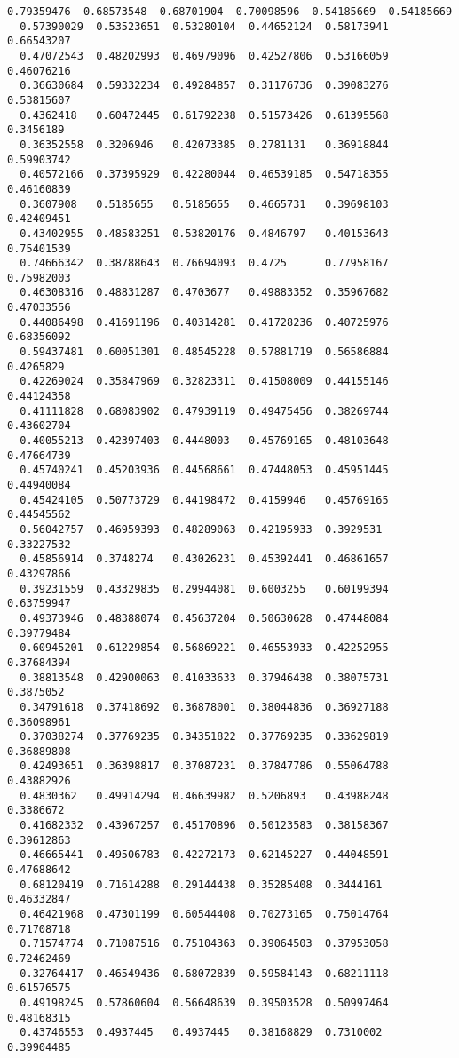 \documentclass[11pt]{article}
\begin{document}
\begin{Verbatim}[commandchars=\\\{\}]
  0.79359476  0.68573548  0.68701904  0.70098596  0.54185669  0.54185669
  0.57390029  0.53523651  0.53280104  0.44652124  0.58173941  0.66543207
  0.47072543  0.48202993  0.46979096  0.42527806  0.53166059  0.46076216
  0.36630684  0.59332234  0.49284857  0.31176736  0.39083276  0.53815607
  0.4362418   0.60472445  0.61792238  0.51573426  0.61395568  0.3456189
  0.36352558  0.3206946   0.42073385  0.2781131   0.36918844  0.59903742
  0.40572166  0.37395929  0.42280044  0.46539185  0.54718355  0.46160839
  0.3607908   0.5185655   0.5185655   0.4665731   0.39698103  0.42409451
  0.43402955  0.48583251  0.53820176  0.4846797   0.40153643  0.75401539
  0.74666342  0.38788643  0.76694093  0.4725      0.77958167  0.75982003
  0.46308316  0.48831287  0.4703677   0.49883352  0.35967682  0.47033556
  0.44086498  0.41691196  0.40314281  0.41728236  0.40725976  0.68356092
  0.59437481  0.60051301  0.48545228  0.57881719  0.56586884  0.4265829
  0.42269024  0.35847969  0.32823311  0.41508009  0.44155146  0.44124358
  0.41111828  0.68083902  0.47939119  0.49475456  0.38269744  0.43602704
  0.40055213  0.42397403  0.4448003   0.45769165  0.48103648  0.47664739
  0.45740241  0.45203936  0.44568661  0.47448053  0.45951445  0.44940084
  0.45424105  0.50773729  0.44198472  0.4159946   0.45769165  0.44545562
  0.56042757  0.46959393  0.48289063  0.42195933  0.3929531   0.33227532
  0.45856914  0.3748274   0.43026231  0.45392441  0.46861657  0.43297866
  0.39231559  0.43329835  0.29944081  0.6003255   0.60199394  0.63759947
  0.49373946  0.48388074  0.45637204  0.50630628  0.47448084  0.39779484
  0.60945201  0.61229854  0.56869221  0.46553933  0.42252955  0.37684394
  0.38813548  0.42900063  0.41033633  0.37946438  0.38075731  0.3875052
  0.34791618  0.37418692  0.36878001  0.38044836  0.36927188  0.36098961
  0.37038274  0.37769235  0.34351822  0.37769235  0.33629819  0.36889808
  0.42493651  0.36398817  0.37087231  0.37847786  0.55064788  0.43882926
  0.4830362   0.49914294  0.46639982  0.5206893   0.43988248  0.3386672
  0.41682332  0.43967257  0.45170896  0.50123583  0.38158367  0.39612863
  0.46665441  0.49506783  0.42272173  0.62145227  0.44048591  0.47688642
  0.68120419  0.71614288  0.29144438  0.35285408  0.3444161   0.46332847
  0.46421968  0.47301199  0.60544408  0.70273165  0.75014764  0.71708718
  0.71574774  0.71087516  0.75104363  0.39064503  0.37953058  0.72462469
  0.32764417  0.46549436  0.68072839  0.59584143  0.68211118  0.61576575
  0.49198245  0.57860604  0.56648639  0.39503528  0.50997464  0.48168315
  0.43746553  0.4937445   0.4937445   0.38168829  0.7310002   0.39904485

\end{Verbatim}
\end{document}
